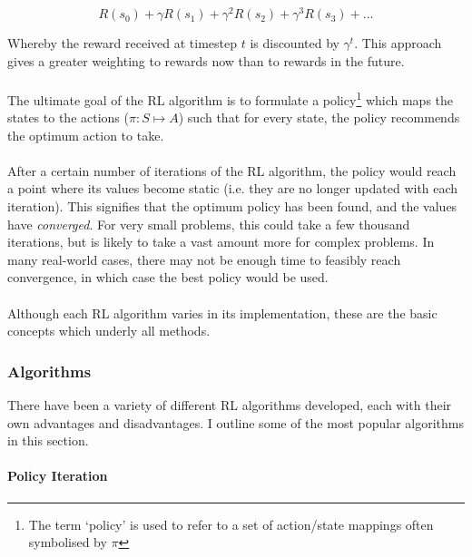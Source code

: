 \documentclass[a4paper,oneside]{report}
\begin{document}
\begin{equation*} 
	R(s_0) + \gamma R(s_1) + \gamma^2 R(s_2) + \gamma^3 R(s_3) + ...
\end{equation*}

Whereby the reward received at timestep $t$ is discounted by $\gamma^t$. This approach gives a greater weighting to rewards now than to rewards in the future.

\paragraph{} The ultimate goal of the RL algorithm is to formulate a policy\footnote{The term `policy' is used to refer to a set of action/state mappings often symbolised by $\pi$} which maps the states to the actions ($\pi: S \mapsto A$) such that for every state, the policy recommends the optimum action to take.

\paragraph{} After a certain number of iterations of the RL algorithm, the policy would reach a point where its values become static (i.e. they are no longer updated with each iteration). This signifies that the optimum policy has been found, and the values have \emph{converged}. For very small problems, this could take a few thousand iterations, but is likely to take a vast amount more for complex problems. In many real-world cases, there may not be enough time to feasibly reach convergence, in which case the best policy would be used.

\paragraph{} Although each RL algorithm varies in its implementation, these are the basic concepts which underly all methods. 

\subsubsection{Algorithms}

There have been a variety of different RL algorithms developed, each with their own advantages and disadvantages. I outline some of the most popular algorithms in this section. 

\paragraph{Policy Iteration}
\end{document}
